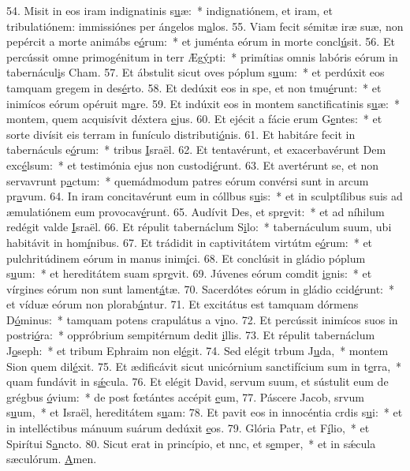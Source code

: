 54. Misit in eos iram indignatinis s\uline{u}æ:~* indignatiónem, et iram, et tribulatiónem: immissiónes per ángelos m\uline{a}los.
55. Viam fecit sémitæ iræ suæ, non pepércit a morte animábs e\uline{ó}rum:~* et juménta eórum in morte concl\uline{ú}sit.
56. Et percússit omne primogénitum in terr Æg\uline{ý}pti:~* primítias omnis labóris eórum in tabernácul\uline{i}s Cham.
57. Et ábstulit sicut oves póplum s\uline{u}um:~* et perdúxit eos tamquam gregem in des\uline{é}rto.
58. Et dedúxit eos in spe, et non tmu\uline{é}runt:~* et inimícos eórum opéruit m\uline{a}re.
59. Et indúxit eos in montem sanctificatinis s\uline{u}æ:~* montem, quem acquisívit déxtera \uline{e}jus.
60. Et ejécit a fácie erum G\uline{e}ntes:~* et sorte divísit eis terram in funículo distributi\uline{ó}nis.
61. Et habitáre fecit in tabernáculs e\uline{ó}rum:~* tribus \uline{I}sraël.
62. Et tentavérunt, et exacerbavérunt Dem exc\uline{é}lsum:~* et testimónia ejus non custodi\uline{é}runt.
63. Et avertérunt se, et non servavrunt p\uline{a}ctum:~* quemádmodum patres eórum convérsi sunt in arcum pr\uline{a}vum.
64. In iram concitavérunt eum in cóllbus s\uline{u}is:~* et in sculptílibus suis ad æmulatiónem eum provocav\uline{é}runt.
65. Audívit Des, et spr\uline{e}vit:~* et ad níhilum redégit valde \uline{I}sraël.
66. Et répulit tabernáclum S\uline{i}lo:~* tabernáculum suum, ubi habitávit in hom\uline{í}nibus.
67. Et trádidit in captivitátem virtútm e\uline{ó}rum:~* et pulchritúdinem eórum in manus inim\uline{í}ci.
68. Et conclúsit in gládio póplum s\uline{u}um:~* et hereditátem suam spr\uline{e}vit.
69. Júvenes eórum comdit \uline{i}gnis:~* et vírgines eórum non sunt lament\uline{á}tæ.
70. Sacerdótes eórum in gládio ccid\uline{é}runt:~* et víduæ eórum non plorab\uline{á}ntur.
71. Et excitátus est tamquam dórmens D\uline{ó}minus:~* tamquam potens crapulátus a v\uline{i}no.
72. Et percússit inimícos suos in postri\uline{ó}ra:~* oppróbrium sempitérnum dedit \uline{i}llis.
73. Et répulit tabernáclum J\uline{o}seph:~* et tribum Ephraim non el\uline{é}git.
74. Sed elégit trbum J\uline{u}da,~* montem Sion quem dil\uline{é}xit.
75. Et ædificávit sicut unicórnium sanctifícium sum in t\uline{e}rra,~* quam fundávit in s\uline{ǽ}cula.
76. Et elégit David, servum suum, et sústulit eum de grégbus \uline{ó}vium:~* de post fœtántes accépit \uline{e}um,
77. Páscere Jacob, srvum s\uline{u}um,~* et Israël, hereditátem s\uline{u}am:
78. Et pavit eos in innocéntia crdis s\uline{u}i:~* et in intelléctibus mánuum suárum dedúxit \uline{e}os.
79. Glória Patr, et F\uline{í}lio,~* et Spirítui S\uline{a}ncto.
80. Sicut erat in princípio, et nnc, et s\uline{e}mper,~* et in sǽcula sæculórum. \uline{A}men.
